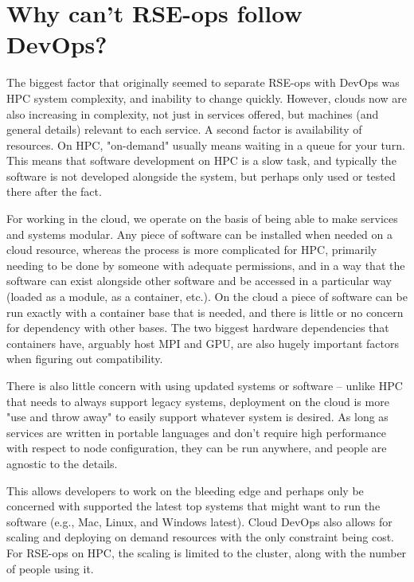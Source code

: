\section{Why can't RSE-ops follow DevOps?}

The biggest factor that originally seemed to separate RSE-ops with DevOps was HPC system complexity, and inability to change quickly. However, clouds now are also increasing in complexity, not just in services offered, but machines (and general details) relevant to each service. A second factor is availability of resources. On HPC, "on-demand" usually means waiting in a queue for your turn. This means that software development on HPC is a slow task, and typically the software is not developed alongside the system, but perhaps only used or tested there after the fact.

For working in the cloud, we operate on the basis of being able to make services and systems modular. Any piece of software can be installed when needed on a cloud resource, whereas the process is more complicated for HPC, primarily needing to be done by someone with adequate permissions, and in a way that the software can exist alongside other software and be accessed in a particular way (loaded as a module, as a container, etc.). On the cloud a piece of software can be run exactly with a container base that is needed, and there is little or no concern for dependency with other bases. The two biggest hardware dependencies that containers have, arguably host MPI and GPU, are also hugely important factors when figuring out compatibility.

There is also little concern with using updated systems or software -- unlike HPC that needs to always support legacy systems, deployment on the cloud is more "use and throw away" to easily support whatever system is desired. As long as services are written in portable languages and don't require high performance with respect to node configuration, they can be run anywhere, and people are agnostic to the details.

This allows developers to work on the bleeding edge and perhaps only be concerned with supported the latest top systems that might  want to run the software (e.g., Mac, Linux, and Windows latest). Cloud DevOps also allows for scaling and deploying on demand resources with the only constraint being cost. For RSE-ops on HPC, the scaling is limited to the cluster, along with the number of people using it.


